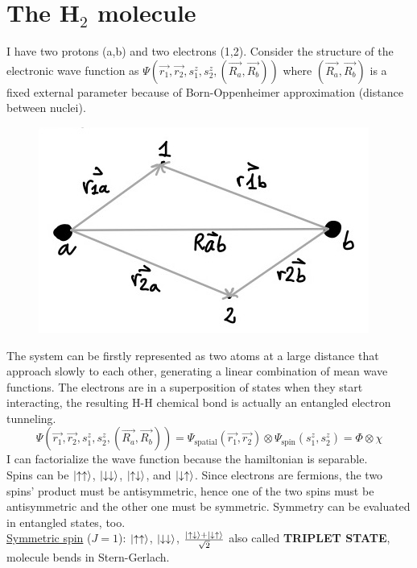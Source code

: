\section{The H$_2$ molecule}
I have two protons (a,b) and two electrons (1,2). Consider the structure of the electronic wave function as $\Psi(\vec{r_1},\vec{r_2},s_1^z,s_2^z,(\vec{R_a},\vec{R_b}))$ where $(\vec{R_a},\vec{R_b})$ is a fixed external parameter because of Born-Oppenheimer approximation (distance between nuclei).\\
\begin{figure}[htbp!]
	\centering
	\includegraphics[scale=0.30]{img_8}
\end{figure}
\newline
The system can be firstly represented as two atoms at a large distance that approach slowly to each other, generating a linear combination of mean wave functions. The electrons are in a superposition of states when they start interacting, the resulting H-H chemical bond is actually an entangled electron tunneling.
\[
\Psi(\vec{r_1},\vec{r_2},s_1^z,s_2^z,(\vec{R_a},\vec{R_b}))=\Psi_{\text{spatial}}(\vec{r_1},\vec{r_2})\otimes\Psi_{\text{spin}}(s_1^z,s_2^z)=\Phi\otimes\chi
\]
I can factorialize the wave function because the hamiltonian is separable.\\
Spins can be $\ket{\uparrow\uparrow}$, $\ket{\downarrow\downarrow}$, $\ket{\uparrow\downarrow}$, and $\ket{\downarrow\uparrow}$. Since electrons are fermions, the two spins' product must be antisymmetric, hence one of the two spins must be antisymmetric and the other one must be symmetric. Symmetry can be evaluated in entangled states, too. \\
\newline
\underline{Symmetric spin} ($J=1$): $\ket{\uparrow\uparrow}$, $\ket{\downarrow\downarrow}$, $\frac{\ket{\uparrow\downarrow}+\ket{\downarrow\uparrow}}{\sqrt{2}}$ also called \textbf{TRIPLET STATE}, molecule bends in Stern-Gerlach.\\
